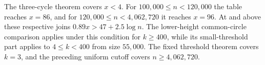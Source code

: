 The three-cycle theorem covers \(x<4\). For \(100{,}000\le n<120{,}000\)
the table reaches \(x=86\), and for \(120{,}000\le n<4{,}062{,}720\)
it reaches \(x=96\). At and above these respective joins
\(0.89x>47+2.5\log n\). The lower-height common-circle comparison
applies under this condition for \(k\ge400\), while its small-threshold
part applies to \(4\le k<400\) from size \(55{,}000\). The fixed
threshold theorem covers \(k=3\), and the preceding uniform cutoff
covers \(n\ge4{,}062{,}720\).
